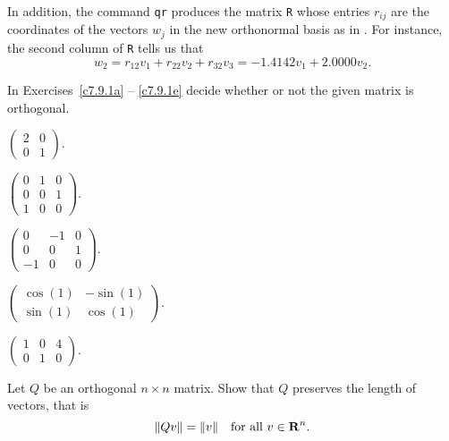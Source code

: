 In addition, the command {\tt qr} produces the matrix {\tt R} whose
entries $r_{ij}$ are the coordinates of the vectors $w_j$ in the
new orthonormal basis as in .  For instance, the second
column of {\tt R} tells us that
\[
w_2 = r_{12}v_1 + r_{22}v_2 + r_{32}v_3 = -1.4142 v_1 + 2.0000 v_2.
\]


\EXER

\TEXER

\noindent In Exercises~\ref{c7.9.1a} -- \ref{c7.9.1e} decide whether or not
the given matrix is orthogonal.
\begin{exercise} \label{c7.9.1a}
$\left(\begin{array}{rr} 2 & 0\\ 0 & 1\end{array}\right)$.
\end{exercise}
\begin{exercise} \label{c7.9.1b}
$\left(\begin{array}{rrr} 0 & 1 & 0\\ 0 & 0 & 1\\
1 & 0 & 0\end{array}\right)$.
\end{exercise}
\begin{exercise} \label{c7.9.1c}
$\left(\begin{array}{rrr} 0 & -1 & 0\\ 0 & 0 & 1\\
-1 & 0 & 0\end{array}\right)$.
\end{exercise}
\begin{exercise} \label{c7.9.1d}
$\left(\begin{array}{rr} \cos(1) & -\sin(1)\\ \sin(1) & \cos(1)
\end{array}\right)$.
\end{exercise}
\begin{exercise} \label{c7.9.1e}
$\left(\begin{array}{rrr} 1 & 0 & 4\\ 0 & 1 & 0
\end{array}\right)$.
\end{exercise}

\begin{exercise} \label{c7.9.2}
Let $Q$ be an orthogonal $n\times n$ matrix.
Show that $Q$ preserves the length of vectors, that is
\[
\|Qv\| = \|v\|\quad \mbox{for all $v\in\mbox{$\bf{R}$}^n$.}
\]
\end{exercise}


